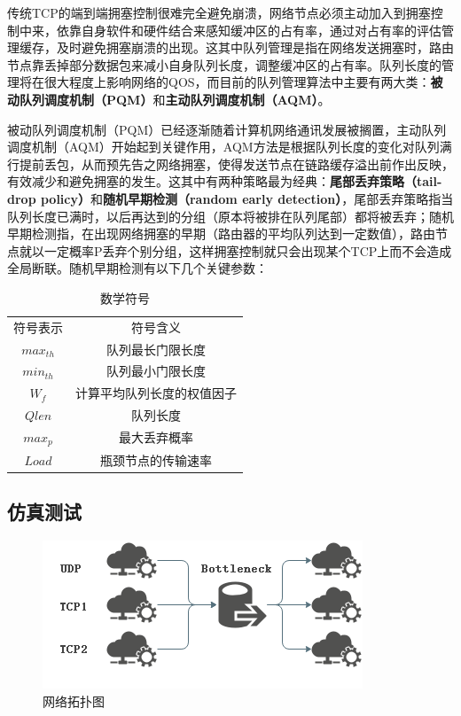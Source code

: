 \documentclass{article}
\begin{document}
传统TCP的端到端拥塞控制很难完全避免崩溃，网络节点必须主动加入到拥塞控制中来，依靠自身软件和硬件结合来感知缓冲区的占有率，通过对占有率的评估管理缓存，及时避免拥塞崩溃的出现。这其中队列管理是指在网络发送拥塞时，路由节点靠丢掉部分数据包来减小自身队列长度，调整缓冲区的占有率。队列长度的管理将在很大程度上影响网络的QOS，而目前的队列管理算法中主要有两大类：\textbf{被动队列调度机制（PQM）}和\textbf{主动队列调度机制（AQM）}。

被动队列调度机制（PQM）已经逐渐随着计算机网络通讯发展被搁置，主动队列调度机制（AQM）开始起到关键作用，AQM方法是根据队列长度的变化对队列满行提前丢包，从而预先告之网络拥塞，使得发送节点在链路缓存溢出前作出反映，有效减少和避免拥塞的发生。这其中有两种策略最为经典：\textbf{尾部丢弃策略（tail-drop policy）}和\textbf{随机早期检测（random early detection）}，尾部丢弃策略指当队列长度已满时，以后再达到的分组（原本将被排在队列尾部）都将被丢弃；随机早期检测指，在出现网络拥塞的早期（路由器的平均队列达到一定数值），路由节点就以一定概率P丢弃个别分组，这样拥塞控制就只会出现某个TCP上而不会造成全局断联。随机早期检测有以下几个关键参数：

\begin{table}[H]
	\centering
	\caption{数学符号}
	\label{table}
	\begin{tabular}{cc}
		\hline
		符号表示&符号含义\\
		$max_{th}$ & 队列最长门限长度\\
		$min_{th}$ & 队列最小门限长度\\
		$W_f$ & 计算平均队列长度的权值因子\\
		$Qlen$ & 队列长度\\
		$max_p$ & 最大丢弃概率\\
		$Load$ & 瓶颈节点的传输速率\\
		\hline
	\end{tabular}
\end{table}

\subsection{仿真测试}

\begin{figure}[H]
	\centering
	\includegraphics[scale=0.6]{picture/topology1.png}
	\caption{网络拓扑图}
	\label{fig:topology1}
\end{figure}
\end{document}
